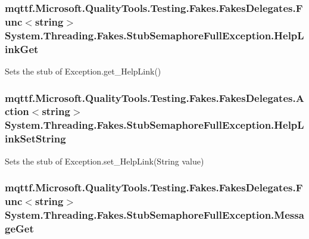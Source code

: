 \hypertarget{class_system_1_1_threading_1_1_fakes_1_1_stub_semaphore_full_exception_a9aa33bbd0767c6f3ff6b705ed1860f72}{
\subsubsection[{Help\-Link\-Get}]{\setlength{\rightskip}{0pt plus 5cm}mqttf.\-Microsoft.\-Quality\-Tools.\-Testing.\-Fakes.\-Fakes\-Delegates.\-Func$<$string$>$ System.\-Threading.\-Fakes.\-Stub\-Semaphore\-Full\-Exception.\-Help\-Link\-Get}}\label{class_system_1_1_threading_1_1_fakes_1_1_stub_semaphore_full_exception_a9aa33bbd0767c6f3ff6b705ed1860f72}


Sets the stub of Exception.\-get\-\_\-\-Help\-Link()

\hypertarget{class_system_1_1_threading_1_1_fakes_1_1_stub_semaphore_full_exception_ac1d858df6de1196a0e5467df83addd6b}{
\subsubsection[{Help\-Link\-Set\-String}]{\setlength{\rightskip}{0pt plus 5cm}mqttf.\-Microsoft.\-Quality\-Tools.\-Testing.\-Fakes.\-Fakes\-Delegates.\-Action$<$string$>$ System.\-Threading.\-Fakes.\-Stub\-Semaphore\-Full\-Exception.\-Help\-Link\-Set\-String}}\label{class_system_1_1_threading_1_1_fakes_1_1_stub_semaphore_full_exception_ac1d858df6de1196a0e5467df83addd6b}


Sets the stub of Exception.\-set\-\_\-\-Help\-Link(\-String value)

\hypertarget{class_system_1_1_threading_1_1_fakes_1_1_stub_semaphore_full_exception_a6fa6c7b3417d22c71ee1fb110fafc318}{
\subsubsection[{Message\-Get}]{\setlength{\rightskip}{0pt plus 5cm}mqttf.\-Microsoft.\-Quality\-Tools.\-Testing.\-Fakes.\-Fakes\-Delegates.\-Func$<$string$>$ System.\-Threading.\-Fakes.\-Stub\-Semaphore\-Full\-Exception.\-Message\-Get}}\label{class_system_1_1_threading_1_1_fakes_1_1_stub_semaphore_full_exception_a6fa6c7b3417d22c71ee1fb110fafc318}


